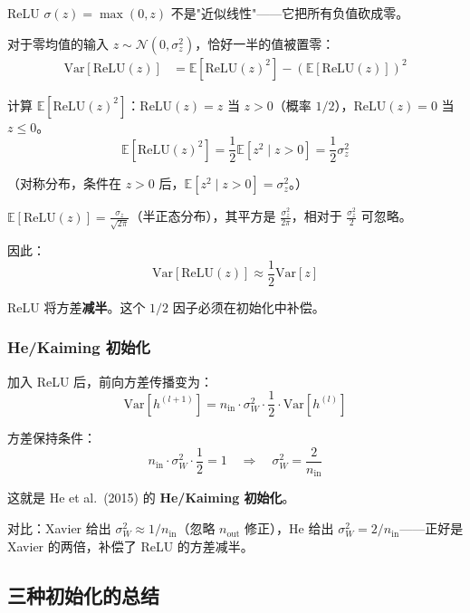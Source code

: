 \documentclass[12pt, a4paper]{ctexart}
\begin{document}
ReLU $\sigma(z) = \max(0, z)$ 不是"近似线性"——它把所有负值砍成零。

对于零均值的输入 $z \sim \mathcal{N}(0, \sigma_z^2)$，恰好一半的值被置零：
\begin{align}
    \text{Var}[\text{ReLU}(z)] &= \mathbb{E}[\text{ReLU}(z)^2] - (\mathbb{E}[\text{ReLU}(z)])^2
\end{align}

计算 $\mathbb{E}[\text{ReLU}(z)^2]$：ReLU$(z) = z$ 当 $z > 0$（概率 $1/2$），ReLU$(z) = 0$ 当 $z \leq 0$。
\begin{equation}
    \mathbb{E}[\text{ReLU}(z)^2] = \frac{1}{2}\mathbb{E}[z^2 \mid z > 0] = \frac{1}{2}\sigma_z^2
\end{equation}

（对称分布，条件在 $z > 0$ 后，$\mathbb{E}[z^2 \mid z > 0] = \sigma_z^2$。）

$\mathbb{E}[\text{ReLU}(z)] = \frac{\sigma_z}{\sqrt{2\pi}}$（半正态分布），其平方是 $\frac{\sigma_z^2}{2\pi}$，相对于 $\frac{\sigma_z^2}{2}$ 可忽略。

因此：
\begin{equation}
    \boxed{\text{Var}[\text{ReLU}(z)] \approx \frac{1}{2}\text{Var}[z]}
\end{equation}

ReLU 将方差\textbf{减半}。这个 $1/2$ 因子必须在初始化中补偿。

\subsubsection{He/Kaiming 初始化}

加入 ReLU 后，前向方差传播变为：
\begin{equation}
    \text{Var}[h^{(l+1)}] = n_{\text{in}} \cdot \sigma_W^2 \cdot \frac{1}{2} \cdot \text{Var}[h^{(l)}]
\end{equation}

方差保持条件：
\begin{equation}
    n_{\text{in}} \cdot \sigma_W^2 \cdot \frac{1}{2} = 1 \quad \Rightarrow \quad \boxed{\sigma_W^2 = \frac{2}{n_{\text{in}}}}
\end{equation}

这就是 He et al.\ (2015) 的 \textbf{He/Kaiming 初始化}。

对比：Xavier 给出 $\sigma_W^2 \approx 1/n_{\text{in}}$（忽略 $n_{\text{out}}$ 修正），He 给出 $\sigma_W^2 = 2/n_{\text{in}}$——正好是 Xavier 的两倍，补偿了 ReLU 的方差减半。

\subsection{三种初始化的总结}
\end{document}
